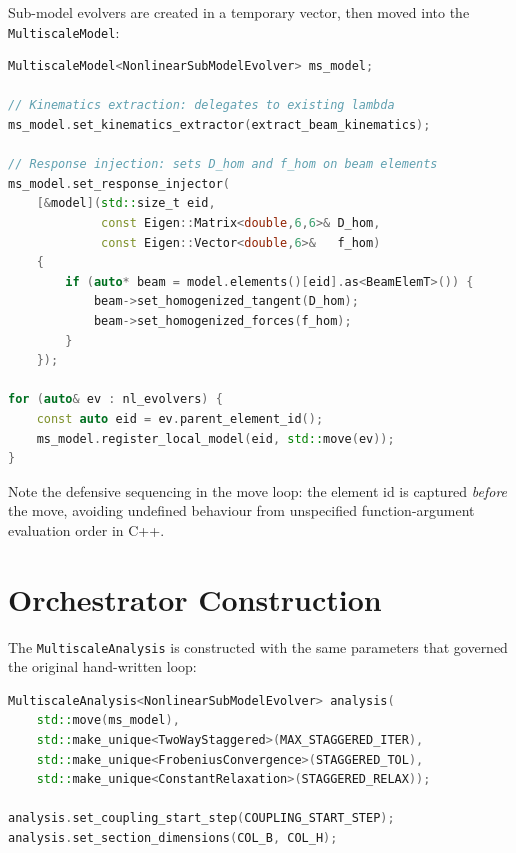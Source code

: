 Sub-model evolvers are created in a temporary vector, then moved into
the \texttt{MultiscaleModel}:

\begin{lstlisting}[language=C++,caption={Evolver transfer and callback
  wiring (section~12 of the driver).},label={lst:driver-transfer}]
MultiscaleModel<NonlinearSubModelEvolver> ms_model;

// Kinematics extraction: delegates to existing lambda
ms_model.set_kinematics_extractor(extract_beam_kinematics);

// Response injection: sets D_hom and f_hom on beam elements
ms_model.set_response_injector(
    [&model](std::size_t eid,
             const Eigen::Matrix<double,6,6>& D_hom,
             const Eigen::Vector<double,6>&   f_hom)
    {
        if (auto* beam = model.elements()[eid].as<BeamElemT>()) {
            beam->set_homogenized_tangent(D_hom);
            beam->set_homogenized_forces(f_hom);
        }
    });

for (auto& ev : nl_evolvers) {
    const auto eid = ev.parent_element_id();
    ms_model.register_local_model(eid, std::move(ev));
}
\end{lstlisting}

Note the defensive sequencing in the move loop: the element id is
captured \emph{before} the move, avoiding undefined behaviour from
unspecified function-argument evaluation order in C++.


\section{Orchestrator Construction}
\label{sec:driver-orchestrator}

The \texttt{MultiscaleAnalysis} is constructed with the same
parameters that governed the original hand-written loop:

\begin{lstlisting}[language=C++,caption={MultiscaleAnalysis
  construction with strategy injection.},
  label={lst:driver-orchestrator}]
MultiscaleAnalysis<NonlinearSubModelEvolver> analysis(
    std::move(ms_model),
    std::make_unique<TwoWayStaggered>(MAX_STAGGERED_ITER),
    std::make_unique<FrobeniusConvergence>(STAGGERED_TOL),
    std::make_unique<ConstantRelaxation>(STAGGERED_RELAX));

analysis.set_coupling_start_step(COUPLING_START_STEP);
analysis.set_section_dimensions(COL_B, COL_H);
\end{lstlisting}


